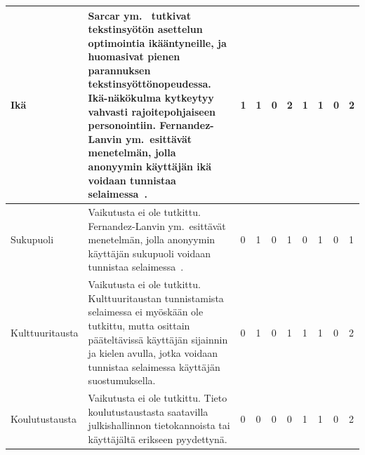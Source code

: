 \documentclass[finnish, 12pt, a4paper, elec, utf8, a-1b, online]{aaltothesis}
\begin{document}
{\begin{longtable}{p{2.5cm}|p{6cm}|p{0.5cm}p{0.5cm}p{0.5cm}|p{0.5cm}|p{0.5cm}p{0.5cm}p{0.5cm}|p{0.5cm}|}
    \midrule
    Ikä                                     & Sarcar ym.~\cite{10.1145/2996267.2996275} tutkivat tekstinsyötön asettelun optimointia ikääntyneille, ja huomasivat pienen parannuksen tekstinsyöttönopeudessa. Ikä-näkökulma kytkeytyy vahvasti rajoitepohjaiseen personointiin. Fernandez-Lanvin ym.\ esittävät menetelmän, jolla anonyymin käyttäjän ikä voidaan tunnistaa selaimessa~\cite{fernandez2018dimension}. & 1                                          & 1                                   & 0                                      & 2                            & 1                                               & 1                                         & 0                                         & 2                            \\
    \midrule
    Sukupuoli                               & Vaikutusta ei ole tutkittu. Fernandez-Lanvin ym.\ esittävät menetelmän, jolla anonyymin käyttäjän sukupuoli voidaan tunnistaa selaimessa~\cite{fernandez2018dimension}.                                                                                                                                                                                                 & 0                                          & 1                                   & 0                                      & 1                            & 0                                               & 1                                         & 0                                         & 1                            \\
    \midrule
    Kulttuuritausta                         & Vaikutusta ei ole tutkittu. Kulttuuritaustan tunnistamista selaimessa ei myöskään ole tutkittu, mutta osittain pääteltävissä käyttäjän sijainnin ja kielen avulla, jotka voidaan tunnistaa selaimessa käyttäjän suostumuksella.                                                                                                                                         & 0                                          & 1                                   & 0                                      & 1                            & 1                                               & 1                                         & 0                                         & 2                            \\
    \midrule
    Koulutustausta                          & Vaikutusta ei ole tutkittu. Tieto koulutustaustasta saatavilla julkishallinnon tietokannoista tai käyttäjältä erikseen pyydettynä.                                                                                                                                                                                                                                      & 0                                          & 0                                   & 0                                      & 0                            & 1                                               & 1                                         & 0                                         & 2                            \\

\end{longtable}}
\end{document}
